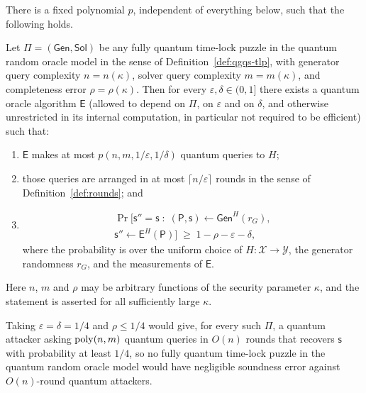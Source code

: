 \documentclass{aicr-conjecture}
\newcommand{\Gen}{\mathsf{Gen}}
\newcommand{\Sol}{\mathsf{Sol}}
\newcommand{\Ext}{\mathsf{E}}
\newcommand{\puz}{\mathsf{P}}
\newcommand{\solu}{\mathsf{s}}
\newcommand{\solatt}{\mathsf{s}''}
\begin{document}
\begin{conjecture}\label{conj:main}
There is a fixed polynomial $p$, independent of everything below, such that
the following holds.

Let $\Pi = (\Gen, \Sol)$ be any fully quantum time-lock puzzle in the
quantum random oracle model in the sense of
Definition~\ref{def:qgqs-tlp}, with generator query complexity
$n = n(\kappa)$, solver query complexity $m = m(\kappa)$, and completeness
error $\rho = \rho(\kappa)$. Then for every
$\varepsilon, \delta \in (0,1]$ there exists a quantum oracle algorithm
$\Ext$ (allowed to depend on $\Pi$, on $\varepsilon$ and on $\delta$, and
otherwise unrestricted in its internal computation, in particular not
required to be efficient) such that:
\begin{enumerate}
  \item $\Ext$ makes at most $p(n, m, 1/\varepsilon, 1/\delta)$ quantum
    queries to $H$;
  \item those queries are arranged in at most
    $\lceil n/\varepsilon \rceil$ rounds in the sense of
    Definition~\ref{def:rounds}; and
  \item
    \begin{multline*}
      \Pr\bigl[\solatt = \solu \;:\;
        (\puz, \solu) \leftarrow \Gen^{H}(r_G), \\
        \solatt \leftarrow \Ext^{H}(\puz)\bigr]
        \;\ge\; 1 - \rho - \varepsilon - \delta,
    \end{multline*}
    where the probability is over the uniform choice of
    $H \colon \mathcal{X} \to \mathcal{Y}$, the generator randomness
    $r_G$, and the measurements of $\Ext$.
\end{enumerate}
Here $n$, $m$ and $\rho$ may be arbitrary functions of the security
parameter $\kappa$, and the statement is asserted for all sufficiently
large $\kappa$.
\end{conjecture}

\begin{corollary}\label{cor:consequence}
Taking $\varepsilon = \delta = 1/4$ and $\rho \le 1/4$ would give, for
every such $\Pi$, a quantum attacker asking $\mathrm{poly}(n,m)$ quantum queries in
$O(n)$ rounds that recovers $\solu$ with probability at least $1/4$, so no
fully quantum time-lock puzzle in the quantum random oracle model would
have negligible soundness error against $O(n)$-round quantum attackers.
\end{corollary}
\end{document}
